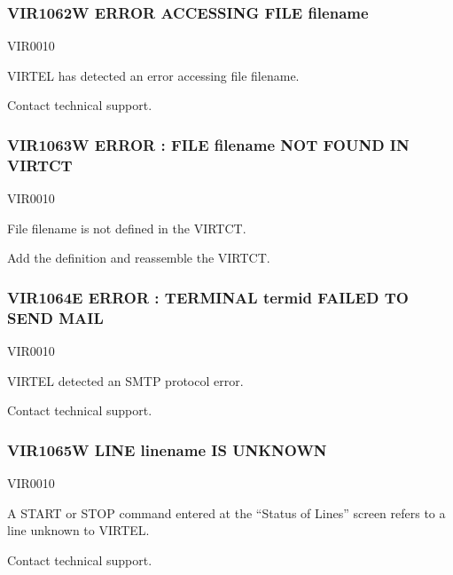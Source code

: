 \documentclass[letterpaper,10pt,english]{sphinxmanual}
\begin{document}
\subsubsection{VIR1062W ERROR ACCESSING FILE filename}
\label{\detokenize{messages:vir1062w-error-accessing-file-filename}}\begin{description}
\sphinxAtStartPar
VIR0010

\sphinxAtStartPar
VIRTEL has detected an error accessing file filename.

\sphinxAtStartPar
Contact technical support.

\end{description}


\subsubsection{VIR1063W ERROR : FILE filename NOT FOUND IN VIRTCT}
\label{\detokenize{messages:vir1063w-error-file-filename-not-found-in-virtct}}\begin{description}
\sphinxAtStartPar
VIR0010

\sphinxAtStartPar
File filename is not defined in the VIRTCT.

\sphinxAtStartPar
Add the definition and reassemble the VIRTCT.

\end{description}


\subsubsection{VIR1064E ERROR : TERMINAL termid FAILED TO SEND MAIL}
\label{\detokenize{messages:vir1064e-error-terminal-termid-failed-to-send-mail}}\begin{description}
\sphinxAtStartPar
VIR0010

\sphinxAtStartPar
VIRTEL detected an SMTP protocol error.

\sphinxAtStartPar
Contact technical support.

\end{description}


\subsubsection{VIR1065W LINE linename IS UNKNOWN}
\label{\detokenize{messages:vir1065w-line-linename-is-unknown}}\begin{description}
\sphinxAtStartPar
VIR0010

\sphinxAtStartPar
A START or STOP command entered at the “Status of Lines” screen refers to a line unknown to VIRTEL.

\sphinxAtStartPar
Contact technical support.

\end{description}
\end{document}
